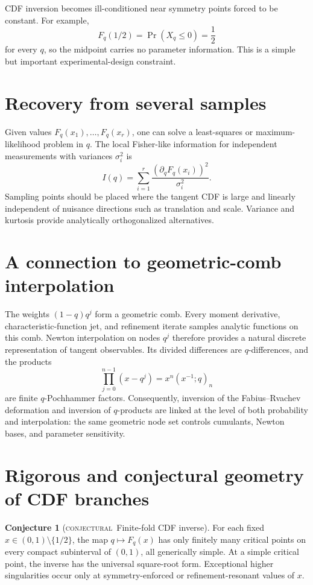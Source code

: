 \documentclass[11pt,letterpaper,oneside,openany]{book}
\theoremstyle{definition}
\newtheorem{conjecture}[theorem]{Conjecture}
\theoremstyle{remark}
\newcommand{\statusconjectural}{\textcolor{conjectureorange}{\textsc{conjectural}}}
\begin{document}
CDF inversion becomes ill-conditioned near symmetry points forced to be
constant.  For example,
\[
 F_q(1/2)=\Pr(X_q\le0)=\frac12
\]
for every \(q\), so the midpoint carries no parameter information.  This is a
simple but important experimental-design constraint.

\section{Recovery from several samples}
Given values \(F_q(x_1),\ldots,F_q(x_r)\), one can solve a least-squares or
maximum-likelihood problem in \(q\).  The local Fisher-like information for
independent measurements with variances \(\sigma_i^2\) is
\[
 I(q)=\sum_{i=1}^r\frac{(\partial_qF_q(x_i))^2}{\sigma_i^2}.
\]
Sampling points should be placed where the tangent CDF is large and linearly
independent of nuisance directions such as translation and scale.  Variance
and kurtosis provide analytically orthogonalized alternatives.

\section{A connection to geometric-comb interpolation}
The weights \((1-q)q^j\) form a geometric comb.  Every moment derivative,
characteristic-function jet, and refinement iterate samples analytic functions
on this comb.  Newton interpolation on nodes \(q^j\) therefore provides a
natural discrete representation of tangent observables.  Its divided
differences are \(q\)-differences, and the products
\[
 \prod_{j=0}^{n-1}(x-q^j)
 =x^n(x^{-1};q)_n
\]
are finite \(q\)-Pochhammer factors.  Consequently, inversion of the
Fabius--Rvachev deformation and inversion of \(q\)-products are linked at the
level of both probability and interpolation: the same geometric node set
controls cumulants, Newton bases, and parameter sensitivity.

\section{Rigorous and conjectural geometry of CDF branches}
\begin{conjecture}[\statusconjectural\ Finite-fold CDF inverse]
For each fixed \(x\in(0,1)\setminus\{1/2\}\), the map
\(q\mapsto F_q(x)\) has only finitely many critical points on every compact
subinterval of \((0,1)\), all generically simple.  At a simple critical point,
the inverse has the universal square-root form.  Exceptional higher
singularities occur only at symmetry-enforced or refinement-resonant values of
\(x\).
\end{conjecture}
\end{document}
